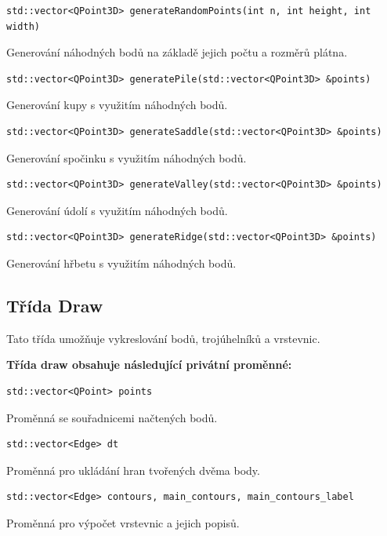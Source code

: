 \documentclass[a4paper, 12pt, oneside, titlepage]{article} %
\begin{document}
\begin{verbatim}
std::vector<QPoint3D> generateRandomPoints(int n, int height, int width)
\end{verbatim}
Generování náhodných bodů na základě jejich počtu a rozměrů plátna.\\

\begin{verbatim}
std::vector<QPoint3D> generatePile(std::vector<QPoint3D> &points)
\end{verbatim}
Generování kupy s využitím náhodných bodů.\\

\begin{verbatim}
std::vector<QPoint3D> generateSaddle(std::vector<QPoint3D> &points)
\end{verbatim}
Generování spočinku s využitím náhodných bodů.\\

\begin{verbatim}
std::vector<QPoint3D> generateValley(std::vector<QPoint3D> &points)
\end{verbatim}
Generování údolí s využitím náhodných bodů.\\

\begin{verbatim}
std::vector<QPoint3D> generateRidge(std::vector<QPoint3D> &points)
\end{verbatim}
Generování hřbetu s využitím náhodných bodů.\\

    
    
\subsection{Třída Draw}
Tato třída umožňuje vykreslování bodů, trojúhelníků a vrstevnic.

\textbf{Třída draw obsahuje následující privátní proměnné:}
\begin{verbatim}
std::vector<QPoint> points
\end{verbatim}
Proměnná se souřadnicemi načtených bodů.\\

\begin{verbatim}
std::vector<Edge> dt
\end{verbatim}
Proměnná pro ukládání hran tvořených dvěma body.\\

\begin{verbatim}
std::vector<Edge> contours, main_contours, main_contours_label
\end{verbatim}
Proměnná pro výpočet vrstevnic a jejich popisů.\\
\end{document}
